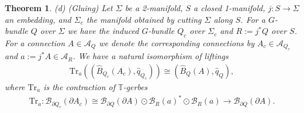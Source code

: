 \documentclass[a4paper,a4paper]{article}
\newtheorem{thm}{Theorem}[section]
\theoremstyle{definition}
\theoremstyle{remark}
\newcommand{\T}{\mathbb{T}}
\newcommand{\A}{\mathcal{A}}
\newcommand{\B}{\mathcal{B}}
\newcommand{\Tr}{\mathrm{Tr}}
\newcommand{\hq}{\widehat{q}}
\def\h#1{ \widehat{#1} }
\begin{document}
\begin{thm}
(d) (Gluing) Let $\Sigma$ be a 2-manifold, $S$ a closed 1-manifold, $j : S \to \Sigma$ an embedding, and $\Sigma_c$ the manifold obtained by cutting $\Sigma$ along $S$. For a $G$-bundle $Q$ over $\Sigma$ we have the induced $G$-bundle $Q_c$ over $\Sigma_c$ and $R := j^*Q$ over $S$. For a connection $A \in \A_Q$ we denote the corresponding connections by $A_c \in \A_{Q_c}$ and $a := j^*A \in \A_R$. We have a natural isomorphism of liftings
\begin{eqnarray}
\Tr_a \left( (\h{B}_{Q_c}(A_c), \hq_{Q_c}) \right)
\cong (\h{B}_Q(A), \hq_Q) ,
\label{axiom_CS_d1}
\end{eqnarray}
where $\Tr_a$ is the contraction of $\T$-gerbes
\begin{eqnarray}
\Tr_a : \B_{\partial Q_c}(\partial A_c) \cong 
\B_{\partial Q}(\partial A) \odot \B_R(a)^* \odot \B_R(a) 
\rightarrow \B_{\partial Q}(\partial A) .
\end{eqnarray}
\end{thm}
\end{document}
